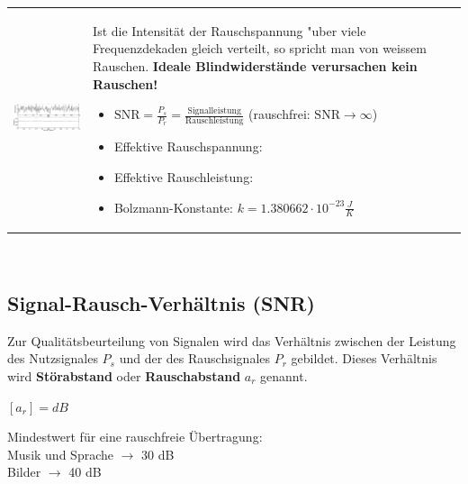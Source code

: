 		\begin{tabularx}{\textwidth}{lX}
			\parbox{8cm}{
				\includegraphics[width=8cm]{./bilder/rauschen2.png}
			} &
			\parbox{9.5cm}{
			Ist die Intensität der
			Rauschspannung "uber viele Frequenzdekaden
			gleich verteilt, so spricht man von weissem Rauschen.\\ \\
			\textbf{Ideale Blindwiderstände verursachen kein Rauschen!}
			\begin{itemize}
     			\item $\text{SNR} = \frac{P_s}{P_r} = \frac{\text{Signalleistung}}{\text{Rauschleistung}}$ (rauschfrei: $ \text{SNR} \rightarrow \infty$) 
     			\item Effektive Rauschspannung: 
     			\item Effektive Rauschleistung: 
     			\item Bolzmann-Konstante: $k =1.380662 \cdot 10^{-23}\frac{J}{K}$
   			\end{itemize}
			}
		\end{tabularx}\\
		
	\subsection{Signal-Rausch-Verhältnis (SNR) }
	
		Zur Qualitätsbeurteilung von Signalen wird das Verhältnis zwischen der Leistung des Nutzsignales $P_s$ und der 
		des Rauschsignales $P_r$ gebildet. Dieses Verhältnis wird \textbf{Störabstand} oder \textbf{Rauschabstand} $a_r$ genannt.\\
	
		\begin{minipage}[]{10cm}
			$[a_r] = dB$\\
		\end{minipage}
		\begin{minipage}[]{10cm}		
			Mindestwert für eine rauschfreie Übertragung: \\
			Musik und Sprache $\rightarrow$ 30 dB \\
			Bilder $\rightarrow$ 40 dB
		\end{minipage}
	
